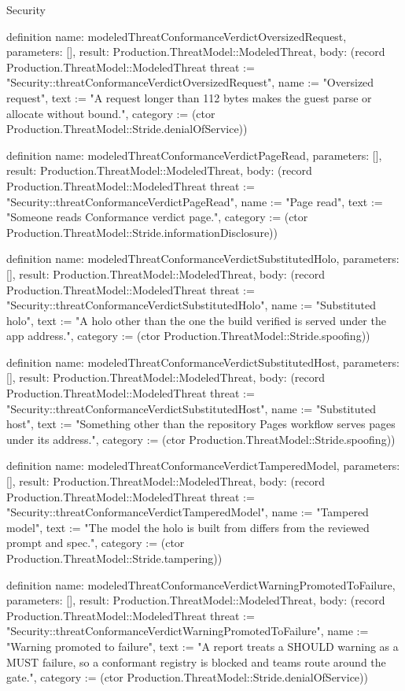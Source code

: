 \begin{lexlean}{Security}
\begin{semanticmodule}
definition{
  name: modeledThreatConformanceVerdictOversizedRequest,
  parameters: [],
  result: Production.ThreatModel::ModeledThreat,
  body: (record Production.ThreatModel::ModeledThreat {threat := "Security::threatConformanceVerdictOversizedRequest", name := "Oversized request", text := "A request longer than 112 bytes makes the guest parse or allocate without bound.", category := (ctor Production.ThreatModel::Stride.denialOfService)})
}

definition{
  name: modeledThreatConformanceVerdictPageRead,
  parameters: [],
  result: Production.ThreatModel::ModeledThreat,
  body: (record Production.ThreatModel::ModeledThreat {threat := "Security::threatConformanceVerdictPageRead", name := "Page read", text := "Someone reads Conformance verdict page.", category := (ctor Production.ThreatModel::Stride.informationDisclosure)})
}

definition{
  name: modeledThreatConformanceVerdictSubstitutedHolo,
  parameters: [],
  result: Production.ThreatModel::ModeledThreat,
  body: (record Production.ThreatModel::ModeledThreat {threat := "Security::threatConformanceVerdictSubstitutedHolo", name := "Substituted holo", text := "A holo other than the one the build verified is served under the app address.", category := (ctor Production.ThreatModel::Stride.spoofing)})
}

definition{
  name: modeledThreatConformanceVerdictSubstitutedHost,
  parameters: [],
  result: Production.ThreatModel::ModeledThreat,
  body: (record Production.ThreatModel::ModeledThreat {threat := "Security::threatConformanceVerdictSubstitutedHost", name := "Substituted host", text := "Something other than the repository Pages workflow serves pages under its address.", category := (ctor Production.ThreatModel::Stride.spoofing)})
}

definition{
  name: modeledThreatConformanceVerdictTamperedModel,
  parameters: [],
  result: Production.ThreatModel::ModeledThreat,
  body: (record Production.ThreatModel::ModeledThreat {threat := "Security::threatConformanceVerdictTamperedModel", name := "Tampered model", text := "The model the holo is built from differs from the reviewed prompt and spec.", category := (ctor Production.ThreatModel::Stride.tampering)})
}

definition{
  name: modeledThreatConformanceVerdictWarningPromotedToFailure,
  parameters: [],
  result: Production.ThreatModel::ModeledThreat,
  body: (record Production.ThreatModel::ModeledThreat {threat := "Security::threatConformanceVerdictWarningPromotedToFailure", name := "Warning promoted to failure", text := "A report treats a SHOULD warning as a MUST failure, so a conformant registry is blocked and teams route around the gate.", category := (ctor Production.ThreatModel::Stride.denialOfService)})
}


\end{semanticmodule}
\end{lexlean}
